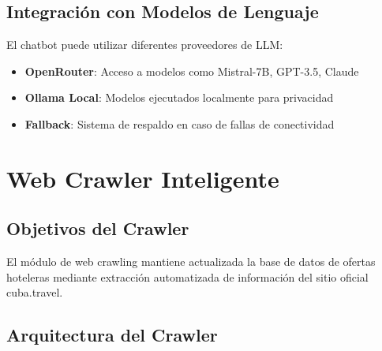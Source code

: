 \documentclass[runningheads]{llncs}
\begin{document}
\subsection{Integración con Modelos de Lenguaje}

El chatbot puede utilizar diferentes proveedores de LLM:

\begin{itemize}
\item \textbf{OpenRouter}: Acceso a modelos como Mistral-7B, GPT-3.5, Claude
\item \textbf{Ollama Local}: Modelos ejecutados localmente para privacidad
\item \textbf{Fallback}: Sistema de respaldo en caso de fallas de conectividad
\end{itemize}

\section{Web Crawler Inteligente}

\subsection{Objetivos del Crawler}

El módulo de web crawling mantiene actualizada la base de datos de ofertas hoteleras mediante extracción automatizada de información del sitio oficial cuba.travel.

\subsection{Arquitectura del Crawler}
\end{document}

